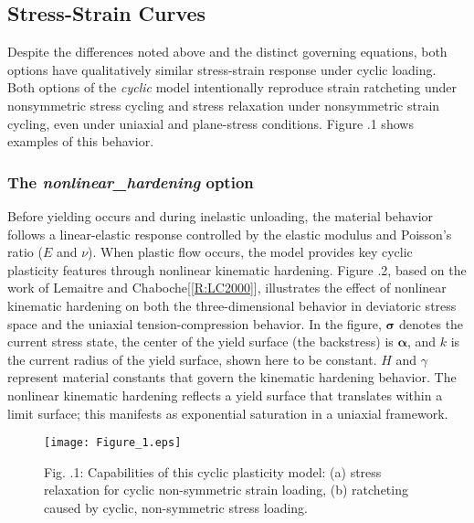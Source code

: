 \documentclass[11pt]{report}
\numberwithin{equation}{section}
\newcommand{\bmf } {\boldsymbol }
\newcommand{\bsf } [1]{\textrm{\textit{#1}}\xspace}
\begin{document}
\subsection{Stress-Strain Curves}
Despite the differences noted above and the distinct governing equations, 
both options have qualitatively similar stress-strain response under 
cyclic loading. Both options of the \textit{cyclic} model intentionally reproduce 
strain ratcheting under nonsymmetric stress cycling and stress relaxation 
under nonsymmetric strain cycling, even under uniaxial and 
plane-stress conditions. Figure \thesection.1 shows examples of this behavior.

\subsubsection {The \bsf{nonlinear\_hardening} option}
Before yielding occurs and during inelastic unloading, the material behavior follows 
a linear-elastic response controlled by the elastic modulus and Poisson's ratio 
($E$ and $\nu$). When plastic flow occurs, the model provides key cyclic plasticity 
features through nonlinear kinematic hardening. Figure \thesection.2, based on the 
work of Lemaitre and Chaboche[\ref{R:LC2000}], illustrates the effect of nonlinear 
kinematic hardening on both the three-dimensional behavior in deviatoric 
stress space and the uniaxial tension-compression behavior. In the 
figure, $\bmf \sigma$ denotes the current stress state, the center of the yield 
surface (the backstress) is $\bmf\alpha$, and $k$ is the current radius of the yield surface, 
shown here to be constant. $H$ and $\gamma$ represent material constants 
that govern the kinematic hardening behavior. The nonlinear kinematic 
hardening reflects a yield surface that translates within a limit surface; this 
manifests as exponential saturation in a uniaxial framework. 

\begin{figure}[htb]
\begin{center}
\texttt{[image: Figure\_1.eps]} 
\caption*{\small 
Fig. \thesection.1: Capabilities of this cyclic plasticity model: (a) stress relaxation
for cyclic non-symmetric strain loading, (b) ratcheting caused by cyclic, non-symmetric 
stress loading.\normalsize}
\label{F:cyclic-capabilities}
\end{center}
\end{figure}
\end{document}
